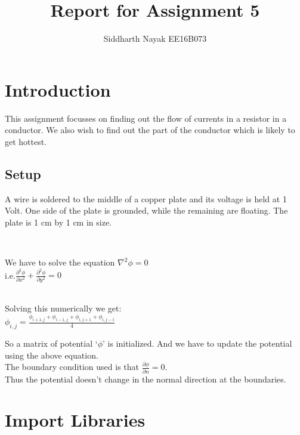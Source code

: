 \documentclass[11pt]{article}
\title{Report for Assignment 5}
\author{Siddharth Nayak EE16B073}
\begin{document}
    
    
    \maketitle
    
    

    
    \hypertarget{introduction}{%
\section{Introduction}\label{introduction}}

This assignment focusses on finding out the flow of currents in a
resistor in a conductor. We also wish to find out the part of the
conductor which is likely to get hottest.

\hypertarget{setup}{%
\subsection{Setup}\label{setup}}

A wire is soldered to the middle of a copper plate and its voltage is
held at 1 Volt. One side of the plate is grounded, while the remaining
are floating. The plate is 1 cm by 1 cm in size.


    
    \begin{center}
    \end{center}
    { \hspace*{\fill} \\}
    

    We have to solve the equation $\nabla^2{\phi}=0$\\
    i.e.$\frac{\partial^2 \phi}{\partial x^2} + \frac{\partial^2 \phi}{\partial y^2}=0$
     
      \\Solving this numerically we get:\\
$\phi_{i,j}= \frac{\phi_{i+1,j}+\phi_{i-1,j}+\phi_{i,j+1}+\phi_{i,j-1}}{4}$

So a matrix of potential `\(\phi\)' is initialized. And we have to
update the potential using the above equation. \\The boundary condition
used is that \(\frac{\partial{\phi}}{\partial{n}}=0\).\\ Thus the potential
doesn't change in the normal direction at the boundaries.

    \hypertarget{import-libraries}{%
\section{Import Libraries}\label{import-libraries}}
\end{document}
